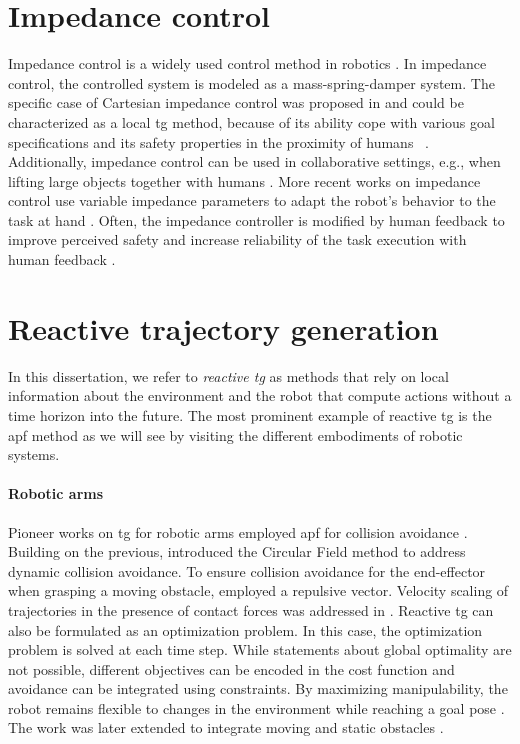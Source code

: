 \section{Impedance control}%
\label{sec:impedance_control}

Impedance control is a widely used control method in
robotics \cite{hogan1985impedance,abu2020variable}. In impedance
control, the controlled system is modeled as a
mass-spring-damper system. The specific case of Cartesian
impedance control was proposed in \cite{albu2002cartesian} and
could be characterized as a local \ac{tg} method, because of
its ability cope with various goal specifications and its
safety properties in the proximity of humans
~\cite{van2022disagreement,hjorth2024enabling}.
Additionally, impedance control can be used in collaborative
settings, e.g., when lifting large objects together with
humans \cite{abu2020variable}. More recent works on
impedance control use variable impedance parameters to adapt
the robot's behavior to the task at hand
\cite{abu2020variable}. Often, the impedance controller is
modified by human feedback to improve perceived safety and
increase reliability of the task execution with human
feedback \cite{lachner2022shaping,franzese2021ilosa}.

\section{Reactive trajectory generation}%
\label{sec:reactive_trajectory_generation}

In this dissertation, we refer to \textit{reactive \ac{tg}}
as methods that rely on local information about the
environment and the robot that compute actions without a
time horizon into the future. The most prominent example of
reactive \ac{tg} is the \acf{apf} method as we will
see by visiting the different embodiments of robotic
systems.

\paragraph{Robotic arms}

Pioneer works on \ac{tg} for robotic arms
employed \ac{apf} for collision avoidance
\cite{Khatib1985,khatib1986real,park2008movement}. Building
on the previous, \cite{Haddadin2011} introduced the Circular
Field method to address dynamic collision avoidance. To
ensure collision avoidance for the end-effector when
grasping a moving obstacle, \cite{Du2018} employed a
repulsive vector.
Velocity scaling of trajectories in the presence of 
contact forces was addressed in \cite{haddadin2010real}.
Reactive \ac{tg} can also be formulated as an optimization
problem. In this case, the optimization problem is solved
at each time step. While statements about global optimality
are not possible, different objectives can be encoded in the
cost function and avoidance can be integrated using
constraints. By maximizing manipulability, the robot remains
flexible to changes in the environment while reaching a goal
pose \cite{haviland2020purely}. The work was later extended
to integrate moving and static obstacles
\cite{haviland2021neo}.

